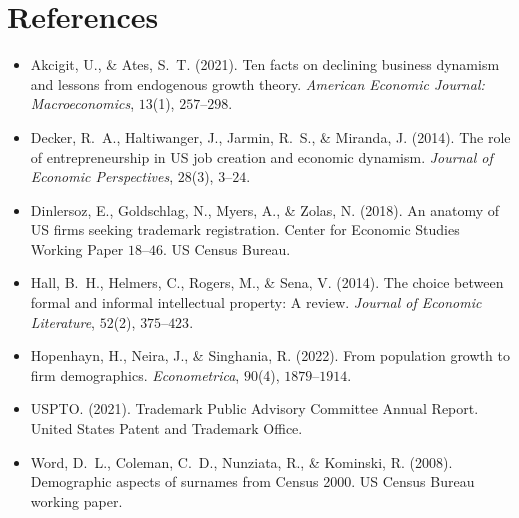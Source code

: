 \documentclass[11pt]{article}
\begin{document}
\section*{References}
\begin{itemize}\setlength\itemsep{2pt}
\item Akcigit, U., \& Ates, S.~T. (2021). Ten facts on declining
  business dynamism and lessons from endogenous growth theory.
  \emph{American Economic Journal: Macroeconomics}, $13$(1), $257$--$298$.
\item Decker, R.~A., Haltiwanger, J., Jarmin, R.~S., \& Miranda, J.
  (2014). The role of entrepreneurship in US job creation and
  economic dynamism. \emph{Journal of Economic Perspectives},
  $28$(3), $3$--$24$.
\item Dinlersoz, E., Goldschlag, N., Myers, A., \& Zolas, N. (2018).
  An anatomy of US firms seeking trademark registration. Center for
  Economic Studies Working Paper $18$--$46$. US Census Bureau.
\item Hall, B.~H., Helmers, C., Rogers, M., \& Sena, V. (2014). The
  choice between formal and informal intellectual property: A review.
  \emph{Journal of Economic Literature}, $52$(2), $375$--$423$.
\item Hopenhayn, H., Neira, J., \& Singhania, R. (2022). From
  population growth to firm demographics. \emph{Econometrica},
  $90$(4), $1879$--$1914$.
\item USPTO. (2021). Trademark Public Advisory Committee Annual
  Report. United States Patent and Trademark Office.
\item Word, D.~L., Coleman, C.~D., Nunziata, R., \& Kominski, R.
  (2008). Demographic aspects of surnames from Census 2000. US
  Census Bureau working paper.
\end{itemize}
\end{document}
